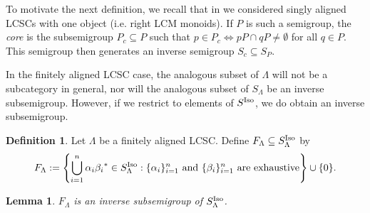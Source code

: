 \documentclass[12pt]{amsart}
\newtheorem{lemma}[thm]{Lemma}
\theoremstyle{definition}
\newtheorem{definition}[thm]{Definition}
\theoremstyle{remark}
\numberwithin{equation}{section}
\renewcommand{\L}{\Lambda}
\renewcommand{\a}{\alpha}
\renewcommand{\b}{\beta}
\newcommand{\Iso}{\textup{Iso}}
\begin{document}
To motivate the next definition, we recall that in \cite{St22} we considered singly aligned LCSCs with one object (i.e. right LCM monoids). If $P$ is such a semigroup, the {\em core} is the subsemigroup $P_c\subseteq P$ such that $p\in P_c\iff pP\cap qP\neq \emptyset$ for all $q\in P$. This semigroup then generates an inverse semigroup $S_c\subseteq S_P$. 
 
 In the finitely aligned LCSC case, the analogous subset of $\L$ will not be a subcategory in general, nor will the analogous subset of $S_\L$ be an inverse subsemigroup. However, if we restrict to elements of $S^\Iso$, we do obtain an inverse subsemigroup.  
	
	
	
	\begin{definition}\label{def:FL}
		Let $\L$ be a finitely aligned LCSC. Define $F_\L\subseteq S_\L^\Iso$ by
		\[
		F_\Lambda : = \left\{\bigcup_{i=1}^n{\a_i}{\b_i}^*\in S_\L^\Iso: \{\a_i\}_{i=1}^n\text{ and }\{\b_i\}_{i=1}^n\text{ are exhaustive}\right\}\cup\{0\}.
		\]
	\end{definition}
	\begin{lemma}
		$F_\L$ is an inverse subsemigroup of $S_\L^\Iso$. 
	\end{lemma}
\end{document}
